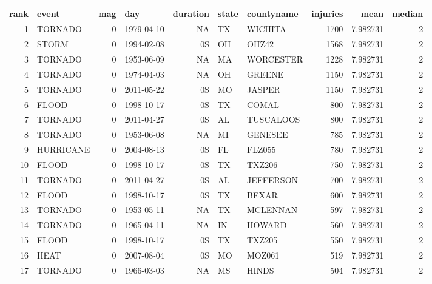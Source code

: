 \documentclass[]{article}
\newenvironment{Shaded}{\begin{snugshade}}{\end{snugshade}}
\newcommand{\KeywordTok}[1]{\textcolor[rgb]{0.13,0.29,0.53}{\textbf{{#1}}}}
\newcommand{\DecValTok}[1]{\textcolor[rgb]{0.00,0.00,0.81}{{#1}}}
\newcommand{\StringTok}[1]{\textcolor[rgb]{0.31,0.60,0.02}{{#1}}}
\newcommand{\CommentTok}[1]{\textcolor[rgb]{0.56,0.35,0.01}{\textit{{#1}}}}
\newcommand{\NormalTok}[1]{{#1}}
\begin{document}
\begin{Shaded}
\end{Shaded}

\begin{longtable}[]{@{}rlrlrllrrr@{}}
\toprule
rank & event & mag & day & duration & state & countyname & injuries &
mean & median\tabularnewline
\midrule
\endhead
1 & TORNADO & 0 & 1979-04-10 & NA & TX & WICHITA & 1700 & 7.982731 &
2\tabularnewline
2 & STORM & 0 & 1994-02-08 & 0S & OH & OHZ42 & 1568 & 7.982731 &
2\tabularnewline
3 & TORNADO & 0 & 1953-06-09 & NA & MA & WORCESTER & 1228 & 7.982731 &
2\tabularnewline
4 & TORNADO & 0 & 1974-04-03 & NA & OH & GREENE & 1150 & 7.982731 &
2\tabularnewline
5 & TORNADO & 0 & 2011-05-22 & 0S & MO & JASPER & 1150 & 7.982731 &
2\tabularnewline
6 & FLOOD & 0 & 1998-10-17 & 0S & TX & COMAL & 800 & 7.982731 &
2\tabularnewline
7 & TORNADO & 0 & 2011-04-27 & 0S & AL & TUSCALOOS & 800 & 7.982731 &
2\tabularnewline
8 & TORNADO & 0 & 1953-06-08 & NA & MI & GENESEE & 785 & 7.982731 &
2\tabularnewline
9 & HURRICANE & 0 & 2004-08-13 & 0S & FL & FLZ055 & 780 & 7.982731 &
2\tabularnewline
10 & FLOOD & 0 & 1998-10-17 & 0S & TX & TXZ206 & 750 & 7.982731 &
2\tabularnewline
11 & TORNADO & 0 & 2011-04-27 & 0S & AL & JEFFERSON & 700 & 7.982731 &
2\tabularnewline
12 & FLOOD & 0 & 1998-10-17 & 0S & TX & BEXAR & 600 & 7.982731 &
2\tabularnewline
13 & TORNADO & 0 & 1953-05-11 & NA & TX & MCLENNAN & 597 & 7.982731 &
2\tabularnewline
14 & TORNADO & 0 & 1965-04-11 & NA & IN & HOWARD & 560 & 7.982731 &
2\tabularnewline
15 & FLOOD & 0 & 1998-10-17 & 0S & TX & TXZ205 & 550 & 7.982731 &
2\tabularnewline
16 & HEAT & 0 & 2007-08-04 & 0S & MO & MOZ061 & 519 & 7.982731 &
2\tabularnewline
17 & TORNADO & 0 & 1966-03-03 & NA & MS & HINDS & 504 & 7.982731 &
2\tabularnewline
\bottomrule
\end{longtable}
\end{document}
